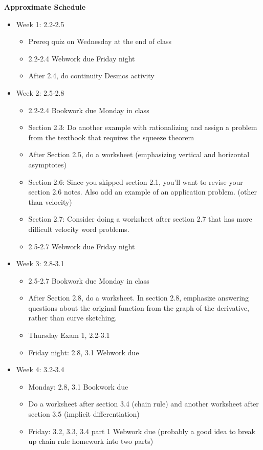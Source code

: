 \documentclass[11pt]{article}
\begin{document}
\noindent\textbf{Approximate Schedule}

\begin{itemize}
\item Week 1: 2.2-2.5
\begin{itemize}
\item Prereq quiz on Wednesday at the end of class
\item 2.2-2.4 Webwork due Friday night
\item After 2.4, do continuity Desmos activity
\end{itemize}
\item Week 2: 2.5-2.8 
\begin{itemize}
\item 2.2-2.4 Bookwork due Monday in class
\item Section 2.3: Do another example with rationalizing and assign a problem from the textbook that requires the squeeze theorem
\item After Section 2.5, do a worksheet (emphasizing vertical and horizontal asymptotes)
\item Section 2.6: Since you skipped section 2.1, you'll want to revise your section 2.6 notes. Also add an example of an application problem. (other than velocity)
\item Section 2.7: Consider doing a worksheet after section 2.7 that has more difficult velocity word problems. 
\item 2.5-2.7 Webwork due Friday night
\end{itemize}
\item Week 3: 2.8-3.1 
\begin{itemize}
\item 2.5-2.7 Bookwork due Monday in class
\item After Section 2.8, do a worksheet. In section 2.8, emphasize answering questions about the original function from the graph of the derivative, rather than curve sketching. 
\item Thursday Exam 1, 2.2-3.1
\item Friday night: 2.8, 3.1 Webwork due 
\end{itemize}
\item Week 4: 3.2-3.4
\begin{itemize}
\item Monday: 2.8, 3.1 Bookwork due
\item Do a worksheet after section 3.4  (chain rule) and another worksheet after section 3.5 (implicit differentiation)
\item Friday: 3.2, 3.3, 3.4 part 1 Webwork due (probably a good idea to break up chain rule homework into two parts)

\end{itemize}
\end{itemize}
\end{document}
